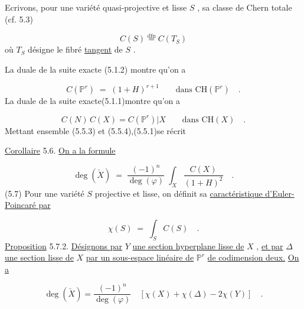 Ecrivons, pour une variété quasi-projective et lisse $S$ , sa classe de Chern totale (cf. 5.3)

\begin{equation}\tag{5.5.2}
C(S) \stackrel{\mathrm{dfn}}{=} C(T_S)
\end{equation}
où $T_S$ désigne le fibré \underline{tangent} de $S$ .



La duale de la suite exacte (5.1.2) montre qu'on a

\begin{equation}\tag{5.5.3}
C(\mathbb{P}^r) \;=\; (1 + H)^{r+1} \qquad \text{dans } \mathrm{CH}(\mathbb{P}^r) \quad .
\end{equation}
La duale de la suite exacte(5.1.1)montre qu'on a

\begin{equation}\tag{5.5.4}
C(N)\, C(X) = C(\mathbb{P}^r)|X \qquad \text{dans } \mathrm{CH}(X) \quad .
\end{equation}
Mettant ensemble (5.5.3) et (5.5.4),(5.5.1)se récrit

\underline{Corollaire} 5.6. \qquad \underline{On a la formule}

\begin{equation}\tag{5.6.1}
\deg(\check{X}) \;=\; \frac{(-1)^n}{\deg(\varphi)} \; \int_X \frac{C(X)}{(1+H)^2} \quad .
\end{equation}
(5.7) Pour une variété $S$ projective et lisse, on définit sa \underline{caractéristique d'Euler-Poincaré par}

\begin{equation}\tag{5.7.1}
\chi(S) \;=\; \int_S C(S) \quad .
\end{equation}
\underline{Proposition} 5.7.2. \qquad \underline{Désignons par} $Y$ \underline{une section hyperplane lisse de} $X$ , \underline{et par} $\Delta$ \underline{une section lisse de} $X$ \underline{par un sous-espace linéaire de} $\mathbb{P}^r$ \underline{de codimension deux.} \underline{On a}

\begin{equation}\tag{5.7.3}
\deg(\check{X}) = \frac{(-1)^n}{\deg(\varphi)} \quad \left[ \chi(X) + \chi(\Delta) - 2\chi(Y) \right] \quad .
\end{equation}


